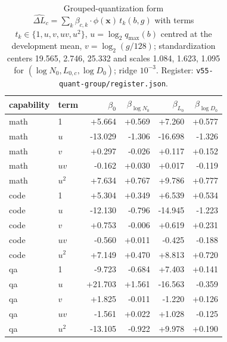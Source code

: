 \begin{table}[t]\centering\footnotesize
\begin{tabular}{@{}llrrrr@{}}
\toprule
capability & term & $\beta_{0}$ & $\beta_{\log N_0}$ & $\beta_{L_0}$ & $\beta_{\log D_0}$ \\
\midrule
math & 1 & +5.664 & +0.569 & +7.260 & +0.577 \\
math & $u$ & -13.029 & -1.306 & -16.698 & -1.326 \\
math & $v$ & +0.297 & -0.026 & +0.117 & +0.152 \\
math & $uv$ & -0.162 & +0.030 & +0.017 & -0.119 \\
math & $u^2$ & +7.634 & +0.767 & +9.786 & +0.777 \\
\midrule
code & 1 & +5.304 & +0.349 & +6.539 & +0.534 \\
code & $u$ & -12.130 & -0.796 & -14.945 & -1.223 \\
code & $v$ & +0.753 & -0.006 & +0.619 & +0.231 \\
code & $uv$ & -0.560 & +0.011 & -0.425 & -0.188 \\
code & $u^2$ & +7.149 & +0.470 & +8.813 & +0.720 \\
\midrule
qa & 1 & -9.723 & -0.684 & +7.403 & +0.141 \\
qa & $u$ & +21.703 & +1.561 & -16.563 & -0.359 \\
qa & $v$ & +1.825 & -0.011 & -1.220 & +0.126 \\
qa & $uv$ & -1.561 & +0.022 & +1.028 & -0.125 \\
qa & $u^2$ & -13.105 & -0.922 & +9.978 & +0.190 \\
\bottomrule\end{tabular}
\caption{Grouped-quantization form $\widehat{\Delta L}_c=\sum_k \beta_{c,k}\cdot\phi(\mathbf x)\,t_k(b,g)$ with terms $t_k\in\{1,u,v,uv,u^2\}$, $u=\log_2 q_{\max}(b)$ centred at the development mean, $v=\log_2(g/128)$; standardization centers 19.565, 2.746, 25.332 and scales 1.084, 1.623, 1.095 for $(\log N_0, L_{0,c}, \log D_0)$; ridge $10^{-3}$. Register: \texttt{v55-quant-group/register.json}.}
\label{tab:quant2d_coef}\end{table}
